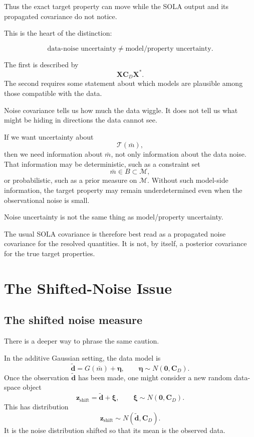 \documentclass[11pt,openany]{book}
\theoremstyle{definition}
\theoremstyle{remark}
\newcommand{\M}{\mathcal M}
\newcommand{\Tau}{\mathcal{T}}
\begin{document}
Thus the exact target property can move while the SOLA output and its propagated covariance
do not notice.

This is the heart of the distinction:

\[
  \text{data-noise uncertainty}
  \neq
  \text{model/property uncertainty}.
\]

The first is described by
\[
  \mathbf X\mathbf C_D\mathbf X^*.
\]
The second requires some statement about which models are plausible among those compatible
with the data.

\begin{intuitionbox}
Noise covariance tells us how much the data wiggle. It does not tell us what might be hiding in
directions the data cannot see.
\end{intuitionbox}

If we want uncertainty about
\[
  \Tau(\bar m),
\]
then we need information about \(\bar m\), not only information about the data noise. That
information may be deterministic, such as a constraint set
\[
  \bar m\in B\subset\M,
\]
or probabilistic, such as a prior measure on \(\M\). Without such model-side information, the
target property may remain underdetermined even when the observational noise is small.

\begin{lessonbox}
Noise uncertainty is not the same thing as model/property uncertainty.
\end{lessonbox}

The usual SOLA covariance is therefore best read as a propagated noise covariance for the
resolved quantities. It is not, by itself, a posterior covariance for the true target properties.

\chapter{The Shifted-Noise Issue}

\section{The shifted noise measure}

There is a deeper way to phrase the same caution.

In the additive Gaussian setting, the data model is
\[
  \widetilde{\mathbf d}
  =
  G(\bar m)+\boldsymbol\eta,
  \qquad
  \boldsymbol\eta\sim N(\mathbf 0,\mathbf C_D).
\]
Once the observation \(\widetilde{\mathbf d}\) has been made, one might consider a new random
data-space object
\[
  \mathbf z_{\mathrm{shift}}
  =
  \widetilde{\mathbf d}+\boldsymbol\xi,
  \qquad
  \boldsymbol\xi\sim N(\mathbf 0,\mathbf C_D).
\]
This has distribution
\[
  \mathbf z_{\mathrm{shift}}
  \sim
  N(\widetilde{\mathbf d},\mathbf C_D).
\]
It is the noise distribution shifted so that its mean is the observed data.
\end{document}
